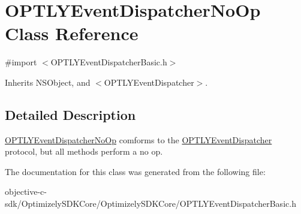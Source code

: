 \hypertarget{interface_o_p_t_l_y_event_dispatcher_no_op}{}\section{O\+P\+T\+L\+Y\+Event\+Dispatcher\+No\+Op Class Reference}
\label{interface_o_p_t_l_y_event_dispatcher_no_op}


{\ttfamily \#import $<$O\+P\+T\+L\+Y\+Event\+Dispatcher\+Basic.\+h$>$}



Inherits N\+S\+Object, and $<$\+O\+P\+T\+L\+Y\+Event\+Dispatcher$>$.



\subsection{Detailed Description}
\mbox{\hyperlink{interface_o_p_t_l_y_event_dispatcher_no_op}{O\+P\+T\+L\+Y\+Event\+Dispatcher\+No\+Op}} comforms to the \mbox{\hyperlink{class_o_p_t_l_y_event_dispatcher-p}{O\+P\+T\+L\+Y\+Event\+Dispatcher}} protocol, but all methods perform a no op. 

The documentation for this class was generated from the following file\+:\begin{DoxyCompactItemize}
\item 
objective-\/c-\/sdk/\+Optimizely\+S\+D\+K\+Core/\+Optimizely\+S\+D\+K\+Core/O\+P\+T\+L\+Y\+Event\+Dispatcher\+Basic.\+h\end{DoxyCompactItemize}
